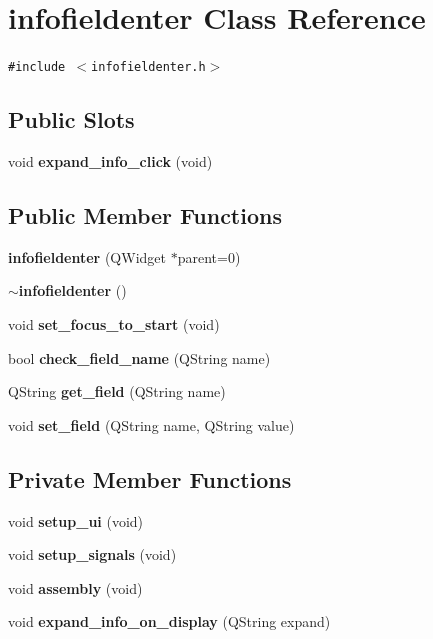 \section{infofieldenter Class Reference}
\label{classinfofieldenter}
{\tt \#include $<$infofieldenter.h$>$}

\subsection*{Public Slots}
\begin{CompactItemize}
\item 
void {\bf expand\_\-info\_\-click} (void)
\end{CompactItemize}
\subsection*{Public Member Functions}
\begin{CompactItemize}
\item 
{\bf infofieldenter} (QWidget $\ast$parent=0)
\item 
{\bf $\sim$infofieldenter} ()
\item 
void {\bf set\_\-focus\_\-to\_\-start} (void)
\item 
bool {\bf check\_\-field\_\-name} (QString name)
\item 
QString {\bf get\_\-field} (QString name)
\item 
void {\bf set\_\-field} (QString name, QString value)
\end{CompactItemize}
\subsection*{Private Member Functions}
\begin{CompactItemize}
\item 
void {\bf setup\_\-ui} (void)
\item 
void {\bf setup\_\-signals} (void)
\item 
void {\bf assembly} (void)
\item 
void {\bf expand\_\-info\_\-on\_\-display} (QString expand)
\end{CompactItemize}
